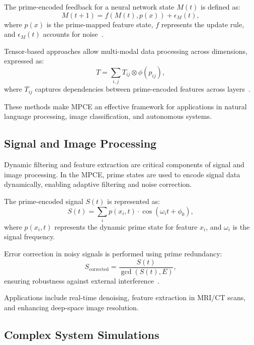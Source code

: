 \documentclass{article}
\theoremstyle{plain}
\begin{document}
The prime-encoded feedback for a neural network state \( M(t) \) is defined as:
\begin{equation}
    M(t+1) = f(M(t), p(x)) + \epsilon_M(t),
\end{equation}
where \( p(x) \) is the prime-mapped feature state, \( f \) represents the update rule, and \( \epsilon_M(t) \) accounts for noise~\cite{grover1996fast, wang2021quantum}.

Tensor-based approaches allow multi-modal data processing across dimensions, expressed as:
\begin{equation}
    T = \sum_{i,j} T_{ij} \otimes \phi(p_{ij}),
\end{equation}
where \( T_{ij} \) captures dependencies between prime-encoded features across layers~\cite{vidal2003efficient}.

These methods make MPCE an effective framework for applications in natural language processing, image classification, and autonomous systems.

\subsection{Signal and Image Processing}

Dynamic filtering and feature extraction are critical components of signal and image processing. In the MPCE, prime states are used to encode signal data dynamically, enabling adaptive filtering and noise correction.

The prime-encoded signal \( S(t) \) is represented as:
\begin{equation}
    S(t) = \sum_{i} p(x_i, t) \cdot \cos(\omega_i t + \phi_0),
\end{equation}
where \( p(x_i, t) \) represents the dynamic prime state for feature \( x_i \), and \( \omega_i \) is the signal frequency.

Error correction in noisy signals is performed using prime redundancy:
\begin{equation}
    S_{\text{corrected}} = \frac{S(t)}{\gcd(S(t), E)},
\end{equation}
ensuring robustness against external interference~\cite{haroche2013nobel, shor1994algorithms}.

Applications include real-time denoising, feature extraction in MRI/CT scans, and enhancing deep-space image resolution.

\subsection{Complex System Simulations}
\end{document}
